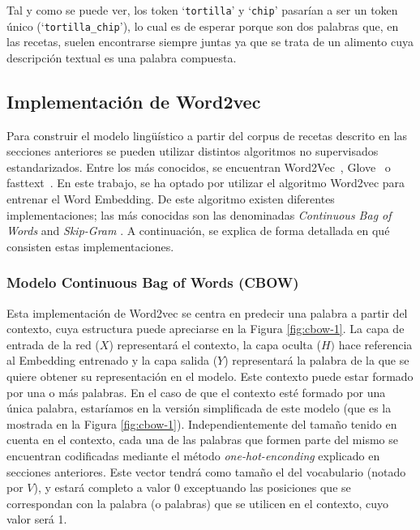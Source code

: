 Tal y como se puede ver, los token `\texttt{tortilla}' y `\texttt{chip}' pasarían a ser un token único (`\texttt{tortilla\_chip}'), lo cual es de esperar porque son dos palabras que, en las recetas, suelen encontrarse siempre juntas ya que se trata de un alimento cuya descripción textual es una palabra compuesta. 


\subsection{Implementación de Word2vec}\label{subsec:implementacion}
Para construir el modelo lingüístico a partir del corpus de recetas descrito en las secciones anteriores se pueden utilizar distintos algoritmos no supervisados estandarizados. Entre los más conocidos, se encuentran Word2Vec~\cite{mikolov2013distributed, mikolov2013efficient}, Glove~\cite{pennington2014glove} o fasttext~\cite{bojanowski2016enriching}. 
En este trabajo, se ha optado por utilizar el algoritmo Word2vec para entrenar el Word Embedding. De este algoritmo existen diferentes implementaciones; las más conocidas son las denominadas \textit{Continuous Bag of Words} and \textit{Skip-Gram} \cite{rong2014word2vec}. A continuación, se explica de forma detallada en qué consisten estas implementaciones. 

\subsubsection{Modelo Continuous Bag of Words (CBOW)}
Esta implementación de Word2vec se centra en predecir una palabra a partir del contexto, cuya estructura puede apreciarse en la Figura \ref{fig:cbow-1}. La capa de entrada de la red ($X$) representará el contexto, la capa oculta ($H)$ hace referencia al Embedding entrenado y la capa salida ($Y$) representará la palabra de la que se quiere obtener su representación en el modelo. Este contexto puede estar formado por una o más palabras. En el caso de que el contexto esté formado por una única palabra, estaríamos en la versión simplificada de este modelo (que es la mostrada en la Figura \ref{fig:cbow-1}). Independientemente del tamaño tenido en cuenta en el contexto, cada una de las palabras que formen parte del mismo se encuentran codificadas mediante el método \textit{one-hot-enconding} explicado en secciones anteriores. Este vector tendrá como tamaño el del vocabulario (notado por $V$), y estará completo a valor 0 exceptuando las posiciones que se correspondan con la palabra (o palabras) que se utilicen en el contexto, cuyo valor será 1.


